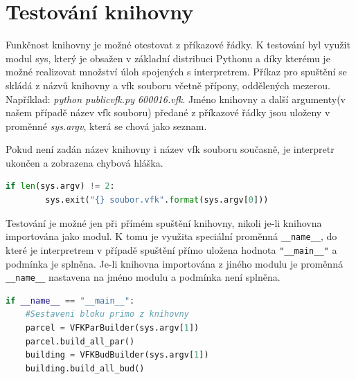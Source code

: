\section{Testování knihovny}
Funkčnost knihovny je možné otestovat z příkazové řádky. K testování byl využit modul sys, který je obsažen v základní distribuci Pythonu a díky kterému je možné realizovat množství úloh spojených s interpretrem. Příkaz pro spuštění se skládá z názvů knihovny a vfk souboru včetně přípony, oddělených mezerou. Například: \textit{python publicvfk.py 600016.vfk}. Jméno knihovny a další argumenty(v našem případě název vfk souboru) předané z příkazové řádky jsou uloženy v proměnné \textit{sys.argv}, která se chová jako seznam.

Pokud není zadán název knihovny i název vfk souboru současně, je interpretr ukončen a zobrazena chybová hláška.
\begin{lstlisting}[language=Python]
    if len(sys.argv) != 2:
        sys.exit("{} soubor.vfk".format(sys.argv[0]))
\end{lstlisting}

Testování je možné jen při přímém spuštění knihovny, nikoli je-li knihovna importována jako modul. K tomu je využita speciální proměnná \verb|__name__|, do které je interpretrem v případě spuštění přímo uložena hodnota \verb|"__main__"| a podmínka je splněna. Je-li knihovna importována z jiného modulu je proměnná \verb|__name__| nastavena na jméno modulu a podmínka není splněna.
\begin{lstlisting}[language=Python]
if __name__ == "__main__":
	#Sestaveni bloku primo z knihovny
    parcel = VFKParBuilder(sys.argv[1])
    parcel.build_all_par()
    building = VFKBudBuilder(sys.argv[1])
    building.build_all_bud()
\end{lstlisting}
